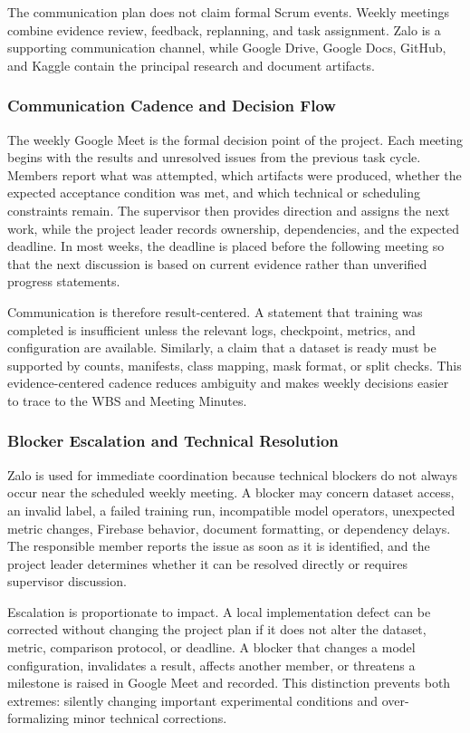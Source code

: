 \endgroup
The communication plan does not claim formal Scrum events. Weekly meetings combine evidence review, feedback, replanning, and task assignment. Zalo is a supporting communication channel, while Google Drive, Google Docs, GitHub, and Kaggle contain the principal research and document artifacts.\par
\subsubsection{Communication Cadence and Decision Flow}
The weekly Google Meet is the formal decision point of the project. Each meeting begins with the results and unresolved issues from the previous task cycle. Members report what was attempted, which artifacts were produced, whether the expected acceptance condition was met, and which technical or scheduling constraints remain. The supervisor then provides direction and assigns the next work, while the project leader records ownership, dependencies, and the expected deadline. In most weeks, the deadline is placed before the following meeting so that the next discussion is based on current evidence rather than unverified progress statements.\par
Communication is therefore result-centered. A statement that training was completed is insufficient unless the relevant logs, checkpoint, metrics, and configuration are available. Similarly, a claim that a dataset is ready must be supported by counts, manifests, class mapping, mask format, or split checks. This evidence-centered cadence reduces ambiguity and makes weekly decisions easier to trace to the WBS and Meeting Minutes.\par
\subsubsection{Blocker Escalation and Technical Resolution}
Zalo is used for immediate coordination because technical blockers do not always occur near the scheduled weekly meeting. A blocker may concern dataset access, an invalid label, a failed training run, incompatible model operators, unexpected metric changes, Firebase behavior, document formatting, or dependency delays. The responsible member reports the issue as soon as it is identified, and the project leader determines whether it can be resolved directly or requires supervisor discussion.\par
Escalation is proportionate to impact. A local implementation defect can be corrected without changing the project plan if it does not alter the dataset, metric, comparison protocol, or deadline. A blocker that changes a model configuration, invalidates a result, affects another member, or threatens a milestone is raised in Google Meet and recorded. This distinction prevents both extremes: silently changing important experimental conditions and over-formalizing minor technical corrections.\par
